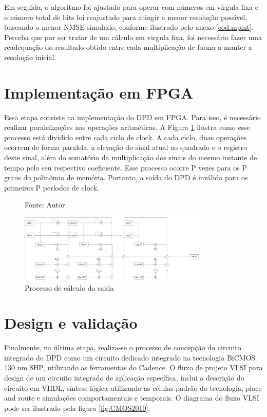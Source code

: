 Em seguida, o algoritmo foi ajustado para operar com números em vírgula fixa e o número total de bits foi reajustado para atingir a menor resolução possível, buscando o menor NMSE simulado, conforme ilustrado pelo anexo \ref{cod:mpint}. Perceba que por ser tratar de um cálculo em virgula fixa, foi necessário fazer uma readequação do resultado obtido entre cada multiplicação de forma a manter a resolução inicial.

\section{Implementação em FPGA}
Essa etapa consiste na implementação do DPD em FPGA. Para isso, é necessário realizar paralelizações nas operações aritméticas. A Figura \ref{fig:diagramaprocess} ilustra como esse processo está dividido entre cada ciclo de clock. A cada ciclo, duas operações ocorrem de forma paralela: a elevação do sinal atual ao quadrado e o registro deste sinal, além do somatório da multiplicação dos sinais do mesmo instante de tempo pelo seu respectivo coeficiente. Esse processo ocorre P vezes para os P graus do polinômio de memória. Portanto, a saída do DPD é inválida para os primeiros P períodos de clock.

\begin{figure}[ht!]
  \centering
  \captionsetup{justification=centering}
  \caption*{Fonte: Autor}
  \includegraphics[width=0.80\textwidth]{diagrama_process.png}
  \caption{Processo de cálculo da saida}
  \label{fig:diagramaprocess}
\end{figure}

\section{Design e validação}
Finalmente, na última etapa, realiza-se o processo de concepção do circuito integrado do DPD como um circuito dedicado integrado na tecnologia BiCMOS 130 nm 8HP, utilizando as ferramentas do Cadence.
O fluxo de projeto VLSI para design de um circuito integrado de aplicação específica, inclui a descrição do circuito em VHDL, síntese lógica utilizando as células padrão da tecnologia, place and route e simulações comportamentais e temporais. O diagrama do fluxo VLSI pode ser ilustrado pela figura \ref{fig:CMOS2010}.

